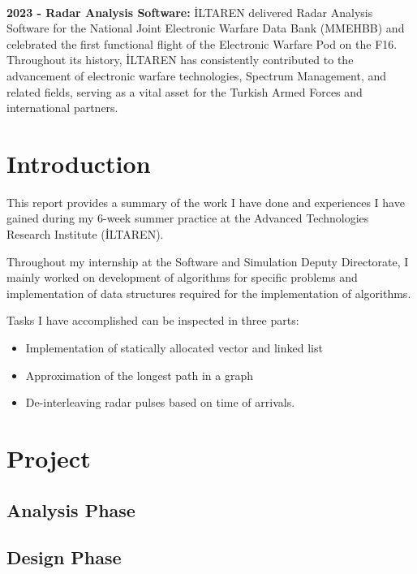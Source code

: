 \documentclass[12pt]{report}
\begin{document}
        \\ \newline
        \textbf{2023 - Radar Analysis Software:} İLTAREN delivered Radar Analysis Software for the National Joint Electronic Warfare Data Bank (MMEHBB) and celebrated the first functional flight of the Electronic Warfare Pod on the F16.
        \\ \newline
    Throughout its history, İLTAREN has consistently contributed to the advancement of electronic warfare technologies, Spectrum Management, and related fields, serving as a vital asset for the Turkish Armed Forces and international partners.

\chapter{Introduction}
    This report provides a summary of the work I have done and experiences I have gained during my 6-week summer 
    practice at the Advanced Technologies Research Institute (İLTAREN). 
    
    Throughout my internship at the Software and Simulation Deputy Directorate, I mainly worked on development of 
    algorithms for specific problems and implementation of data structures required for the implementation of algorithms.
    \newline

    Tasks I have accomplished can be inspected in three parts: 
    \begin{itemize}
        \item Implementation of statically allocated vector and linked list
        \item Approximation of the longest path in a graph
        \item De-interleaving radar pulses based on time of arrivals.
    \end{itemize}

    

\chapter{Project}

    \section{Analysis Phase}

    \section{Design Phase}
\end{document}
